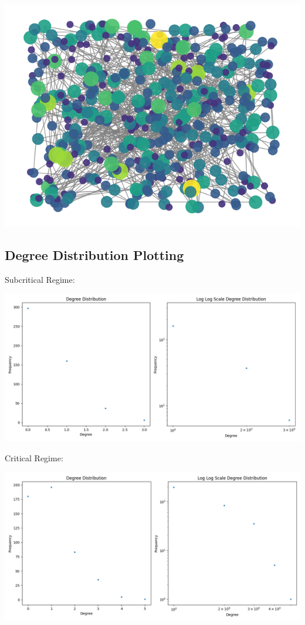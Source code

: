 \documentclass[11pt]{article}
\begin{document}
\includegraphics[scale=0.5]{supcgv.png}

\subsection{Degree Distribution Plotting}

Subcritical Regime:

\includegraphics[scale=0.5]{subcgdis.png}

Critical Regime:

\includegraphics[scale=0.5]{cgdis.png}
\end{document}
